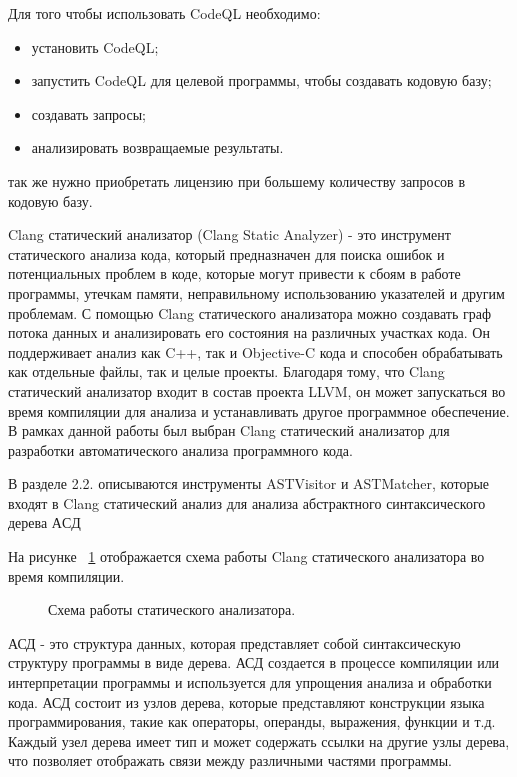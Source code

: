 Для того чтобы использовать CodeQL необходимо: 
\begin{itemize}
    \item установить CodeQL;
    \item запустить CodeQL для целевой программы, чтобы создавать кодовую базу;
    \item создавать запросы;
    \item анализировать возвращаемые результаты.
\end{itemize}
так же нужно приобретать лицензию при большему количеству запросов в кодовую базу.

Clang статический анализатор (Clang Static Analyzer) - это инструмент статического анализа кода, который предназначен для поиска ошибок и потенциальных проблем в коде, которые могут привести к сбоям в работе программы, утечкам памяти, неправильному использованию указателей и другим проблемам. С помощью Clang статического анализатора можно  создавать граф потока данных и анализировать его состояния на различных участках кода. Он поддерживает анализ как C++, так и Objective-C кода и способен обрабатывать как отдельные файлы, так и целые проекты. Благодаря тому, что Clang статический анализатор входит в состав проекта LLVM, он может запускаться во время компиляции для анализа и устанавливать другое программное обеспечение.
В рамках данной работы был выбран Clang статический анализатор для разработки автоматического анализа программного кода. 

В разделе 2.2. описываются инструменты ASTVisitor и ASTMatcher, которые входят в Clang статический анализ для анализа абстрактного синтаксического дерева \(АСД\) 

На рисунке ~\cref{fig:ClangSA} отображается схема работы Clang статического анализатора во время компиляции.
\begin{figure}[ht]
    \caption{Схема работы статического анализатора.}\label{fig:ClangSA}
\end{figure}

АСД - это структура данных, которая представляет собой синтаксическую структуру программы в виде дерева. АСД создается в процессе компиляции или интерпретации программы и используется для упрощения анализа и обработки кода. АСД состоит из узлов дерева, которые представляют конструкции языка программирования, такие как операторы, операнды, выражения, функции и т.д. Каждый узел дерева имеет тип и может содержать ссылки на другие узлы дерева, что позволяет отображать связи между различными частями программы.


